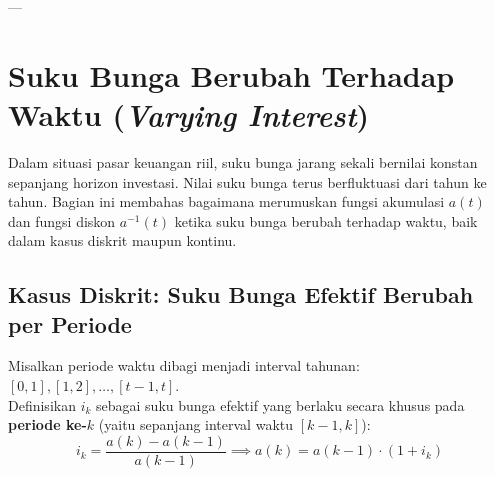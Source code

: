 \documentclass[11pt,a4paper]{article}
\begin{document}
---

\section{Suku Bunga Berubah Terhadap Waktu (\textit{Varying Interest})}

Dalam situasi pasar keuangan riil, suku bunga jarang sekali bernilai konstan sepanjang horizon investasi. Nilai suku bunga terus berfluktuasi dari tahun ke tahun. Bagian ini membahas bagaimana merumuskan fungsi akumulasi $a(t)$ dan fungsi diskon $a^{-1}(t)$ ketika suku bunga berubah terhadap waktu, baik dalam kasus diskrit maupun kontinu.

\subsection{Kasus Diskrit: Suku Bunga Efektif Berubah per Periode}
Misalkan periode waktu dibagi menjadi interval tahunan: $[0,1], [1,2], \dots, [t-1, t]$.\\
Definisikan $i_k$ sebagai suku bunga efektif yang berlaku secara khusus pada \textbf{periode ke-$k$} (yaitu sepanjang interval waktu $[k-1, k]$):
\begin{equation}
    i_k = \frac{a(k) - a(k-1)}{a(k-1)} \implies a(k) = a(k-1) \cdot (1 + i_k)
\end{equation}
\end{document}
